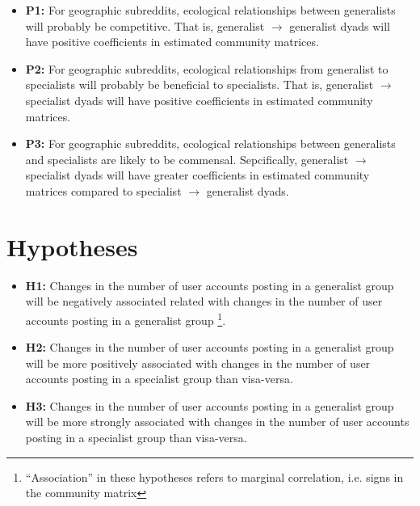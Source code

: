 \documentclass[12pt]{memoir}
\begin{document}
\begin{itemize}
\item \textbf{P1:} For geographic subreddits, ecological relationships between generalists will probably be competitive. That is, generalist $\rightarrow$ generalist dyads will have positive coefficients in estimated community matrices. 

\item \textbf{P2:} For geographic subreddits, ecological relationships from generalist to specialists will probably be beneficial to specialists. That is, generalist $\rightarrow$ specialist dyads will have positive coefficients in estimated community matrices.


\item \textbf{P3:} For geographic subreddits, ecological relationships between generalists and specialists are likely to be commensal. Sepcifically, generalist $\rightarrow$ specialist dyads will have greater coefficients in estimated community matrices compared to specialist $\rightarrow$ generalist dyads. 

\end{itemize}

\section{Hypotheses}
\begin{itemize}

\item \textbf{H1:} Changes in the number of user accounts posting in a generalist group will be negatively associated related with changes in the number of user accounts posting in a generalist group  \footnote{``Association'' in these hypotheses refers to marginal correlation, i.e. signs in the community matrix}.

\item \textbf{H2:} Changes in the number of user accounts posting in a generalist group will be more positively associated with changes in the number of user accounts posting in a specialist group than visa-versa.

\item \textbf{H3:} Changes in the number of user accounts posting in a generalist group will be more strongly associated with changes in the number of user accounts posting in a specialist group than visa-versa.

\end{itemize}
\end{document}
